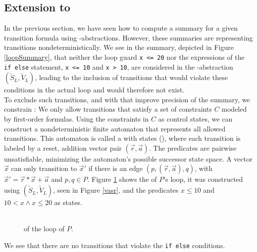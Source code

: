 \subsection{Extension to \qvasrs}
\begin{comment}
\jw{Introduction qvasrs $\rightarrow$ summary precision improvement \\
- What are qvasr? How to compute their reachability relation $\rightarrow$ Parikh image? \\ 
How do they improve precision? \\
- running example to qvasrs \\
\vspace{1cm}
15 pages}
\end{comment}
In the previous section, we have seen how to compute a summary for a given transition formula using \qvasr-abstractions. However, these summaries are representing transitions nondeterministically.
We see in the summary, depicted in Figure \ref{loopSummary}, that neither the loop guard \texttt{x <= 20} nor the expressions of the \texttt{if else} statement, \texttt{x <= 10} and \texttt{x > 10}, are considered in the \qvasr-abstraction $(\tilde{S}_L, \tilde{V}_L)$, leading to the inclusion of transitions that would violate these conditions in the actual loop and would therefore not exist. \\
To exclude such transitions, and with that improve precision of the summary, we constrain \qvasr: We only allow transitions that satisfy a set of constraints $C$ modeled by first-order formulas. Using the constraints in $C$ as control states, we can construct a nondeterministic finite automaton that represents all allowed transitions. This automaton is called a \qvasr with states (\qvasrs), where each transition is labeled by a reset, addition vector pair $(\vec{r}, \vec{a})$. The predicates are pairwise unsatisfiable, minimizing the automaton's possible successor state space. A vector $\vec{x}$ can only transition to $\vec{x}'$ if there is an edge $(p, (\vec{r}, \vec{a}), q)$, with $\vec{x}' = \vec{r} * \vec{x} + \vec{a}$ and $p, q \in P$.
Figure \ref{vasrs} shows the \qvasrs of $P$'s loop, it was constructed using $(\tilde{S}_L, \tilde{V}_L)$, seen in Figure \ref{vasr}, and the predicates $x \leq 10$ and $10 < x \land x \leq 20$ as states.
\begin{figure}[H]
	
	\caption{\\ \qvasrs of the loop of $P$.}
	\label{vasrs}
\end{figure}
We see that there are no transitions that violate the \texttt{if else} conditions. \par
